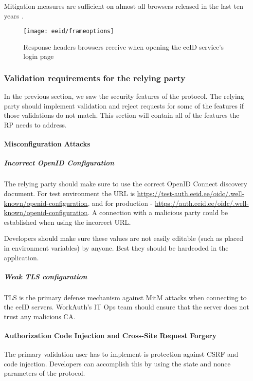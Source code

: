 Mitigation measures are sufficient on almost all browsers released in the last ten years \cite{caniuse-xframeoptions}.

\begin{figure}
  \centering
  \texttt{[image: eeid/frameoptions]}
  \caption{Response headers browsers receive when opening the eeID service's login page}
  \label{fig:eeid-responseheaders}
\end{figure}

\subsubsection{Validation requirements for the relying party}

In the previous section, we saw the security features of the protocol. The relying party should implement validation and reject requests for some of the features if those validations do not match. This section will contain all of the features the RP needs to address.

\paragraph{Misconfiguration Attacks}

\subparagraph{Incorrect OpenID Configuration}

The relying party should make sure to use the correct OpenID Connect discovery document. For test environment the URL is \url{https://test-auth.eeid.ee/oidc/.well-known/openid-configuration}, and for production - \url{https://auth.eeid.ee/oidc/.well-known/openid-configuration}. A connection with a malicious party could be established when using the incorrect URL.

Developers should make sure these values are not easily editable (such as placed in environment variables) by anyone. Best they should be hardcoded in the application.

\subparagraph{Weak TLS configuration}

TLS is the primary defense mechanism against MitM attacks when connecting to the eeID servers. WorkAuth's IT Ops team should ensure that the server does not trust any malicious CA.

\paragraph{Authorization Code Injection and Cross-Site Request Forgery}

The primary validation user has to implement is protection against CSRF and code injection. Developers can accomplish this by using the state and nonce parameters of the protocol.

